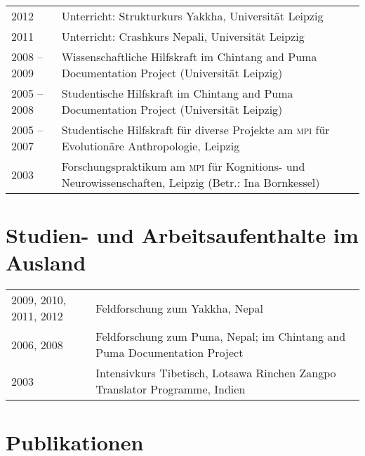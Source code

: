 \begin{tabularx}{\textwidth}{@{}p{9em}X}
2012&		Unterricht: Strukturkurs Yakkha, Universität Leipzig\\
2011& Unterricht: Crashkurs Nepali, Universität Leipzig\\
2008 – 2009&		Wissenschaftliche Hilfskraft im Chintang and Puma Documentation Project (Universität Leipzig)\\
2005 – 2008&	Studentische Hilfskraft im Chintang and Puma Documentation Project (Universität Leipzig)\\
2005 –  2007&		Studentische Hilfskraft für diverse Projekte am \textsc{mpi} für Evolutionäre Anthropologie, Leipzig\\
 2003&			Forschungspraktikum am \textsc{mpi} für Kognitions- und Neurowissenschaften, Leipzig (Betr.: Ina Bornkessel)\\
\end{tabularx}


\section*{Studien- und Arbeitsaufenthalte im Ausland}

\begin{tabularx}{\textwidth}{@{}p{9em}X}
2009, 2010, 2011, 2012&		Feldforschung zum Yakkha, Nepal\\
2006, 2008&					Feldforschung zum Puma, Nepal; im Chintang and Puma Documentation Project \\
2003&						Intensivkurs Tibetisch, Lotsawa Rinchen Zangpo Translator Programme, Indien\\
\end{tabularx}


\section*{Publikationen}

